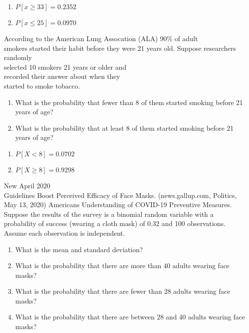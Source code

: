 \documentclass[11pt]{book}\usepackage[]{graphicx}\usepackage[]{color}
\begin{document}
\begin{exercises}
\begin{solution}
\begin{enumerate}
\item $P[ x \ge 33] = 0.2352$
\item $P[ x \le 25] = 0.0970$
\end{enumerate}

\end{solution}

\begin{exercise}   %



According to the American Lung Assocation (ALA) 90\% of adult \\ smokers started their habit before they were 21 years old.    Suppose researchers randomly \\ selected 10 smokers 21 years or older and \\ recorded their answer about when they \\ started to smoke tobacco.

\begin{enumerate}
\item What is the  probability that fewer than 8 of them started smoking before 21 \\ years of age?
\item What is the  probability that at least 8 of them started smoking before 21 years of age?
\end{enumerate}

\end{exercise}
\begin{solution}   %

\begin{enumerate}
\item $P[ X < 8 ] = 0.0702$ 
\item $P[ X \ge 8 ] = 0.9298$ 
\end{enumerate}

\end{solution}

\begin{exercise}    %

New April 2020 \\ Guidelines Boost Perceived Efficacy of Face Masks.  (news.gallup.com, Politics, May 13, 2020) Americans Understanding of COVID-19 Preventive Measures.  Suppose the results of the survey is a binomial random variable with a probability of success (wearing a cloth mask) of 0.32 and 100 observations.  Assume each observation is independent.  

\begin{enumerate}
\item What is the mean and standard deviation?
\item What is the probability that there are more than 40 adults wearing face \\ masks?
\item What is the probability that there are fewer than 28 adults wearing face \\ masks?
\item What is the probability that there are between 28 and 40 adults wearing face masks?
\end{enumerate}


\end{exercise}
\end{exercises}
\end{document}
